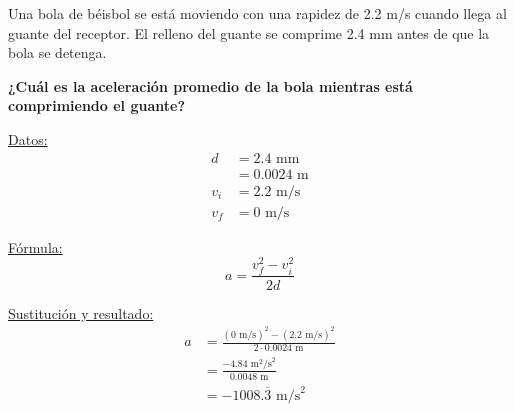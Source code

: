\question[10] Una bola de béisbol se está moviendo con una rapidez de 2.2 m/s cuando llega al guante del receptor.
El relleno del guante se comprime 2.4 mm antes de que la bola se detenga.

\textbf{¿Cuál es la aceleración promedio de la bola mientras está comprimiendo el guante?}
\begin{minipage}[c]{\linewidth}
    \begin{solutionbox}{5cm}
        \begin{minipage}[t]{0.3\textwidth}
            \centering
            \underline{Datos:}
            \begin{align*}
                d   & =  2.4 \text{ mm}  \\
                & = 0.0024 \text{ m} \\
                v_i & = 2.2  \text{ m/s} \\
                v_f & = 0  \text{ m/s}
            \end{align*}
        \end{minipage}%
        \begin{minipage}[t]{0.3\textwidth}
            \centering
            \underline{F\'ormula:}
            \begin{equation*}
                a=\frac{v_f^2-v_i^2}{2d}
            \end{equation*}
        \end{minipage}
        \begin{minipage}[t]{0.3\textwidth}
            \centering
            \underline{Sustituci\'on y resultado:}
            \begin{align*}
                a & =\frac{(0 \text{ m/s})^2-(2.2 \text{ m/s})^2}{2\cdot0.0024 \text{ m}} \\
                  & = \frac{- 4.84\text{ m}^2\text{/s}^2}{0.0048 \text{ m}}             \\
                  & =-1008.\overline{3} \text{ m/s}^2
            \end{align*}
        \end{minipage}
    \end{solutionbox}
\end{minipage}